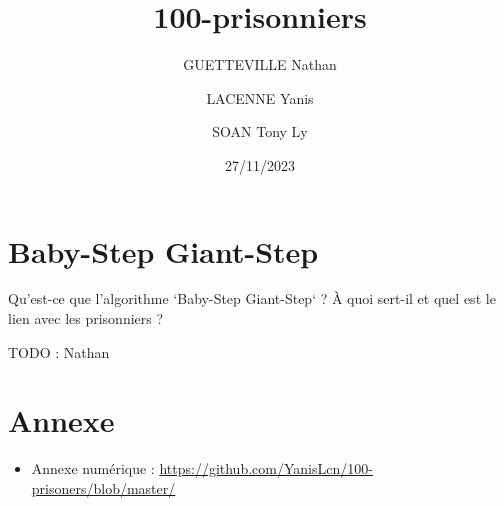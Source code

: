 \documentclass[a4paper]{article}
\title{100-prisonniers}
\date{27/11/2023}
\author{GUETTEVILLE Nathan}
\author{LACENNE Yanis}
\author{SOAN Tony Ly}
\affil{G4S12}
\begin{document}
\maketitle


\tableofcontents

\newpage







\section{Baby-Step Giant-Step}
Qu'est-ce que l'algorithme `Baby-Step Giant-Step` ? À quoi sert-il et quel est le lien avec les prisonniers ?

TODO : Nathan



\section{Annexe}
\begin{itemize}
	\item Annexe numérique : \url{https://github.com/YanisLcn/100-prisoners/blob/master/}

\end{itemize}


\end{document}

